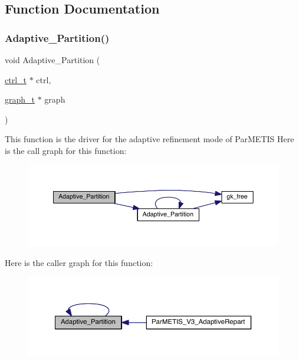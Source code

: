 \subsection{Function Documentation}
\mbox{\label{a00951_a1d2fe970dae698e29842b43085e1f853}} 
\subsubsection{\texorpdfstring{Adaptive\+\_\+\+Partition()}{Adaptive\_Partition()}}
{\footnotesize\ttfamily void Adaptive\+\_\+\+Partition (\begin{DoxyParamCaption}\item[{\hyperlink{a00742}{ctrl\+\_\+t} $\ast$}]{ctrl,  }\item[{\hyperlink{a00734}{graph\+\_\+t} $\ast$}]{graph }\end{DoxyParamCaption})}

This function is the driver for the adaptive refinement mode of Par\+M\+E\+T\+IS Here is the call graph for this function\+:\nopagebreak
\begin{figure}[H]
\begin{center}
\leavevmode
\includegraphics[width=350pt]{a00951_a1d2fe970dae698e29842b43085e1f853_cgraph}
\end{center}
\end{figure}
Here is the caller graph for this function\+:\nopagebreak
\begin{figure}[H]
\begin{center}
\leavevmode
\includegraphics[width=350pt]{a00951_a1d2fe970dae698e29842b43085e1f853_icgraph}
\end{center}
\end{figure}
\mbox{\label{a00951_afedcf14063f4d8678a3746a1152dd71c}} 
